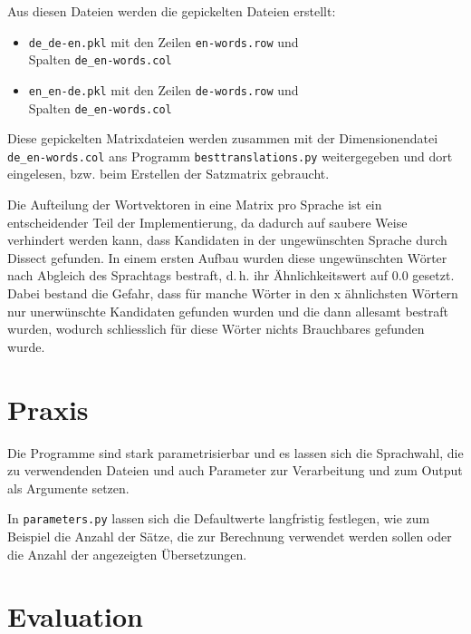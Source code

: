 \documentclass[11pt,twoside,openright]{mpreport}
\begin{document}
Aus diesen Dateien werden die gepickelten Dateien erstellt:
\begin{itemize}
\item \verb+de_de-en.pkl+ mit den Zeilen \verb+en-words.row+ und \\Spalten \verb+de_en-words.col+
\item \verb+en_en-de.pkl+ mit den Zeilen \verb+de-words.row+ und \\Spalten \verb+de_en-words.col+
\end{itemize}

Diese gepickelten Matrixdateien werden zusammen mit der Dimensionendatei \verb+de_en-words.col+ ans Programm \verb+besttranslations.py+ weitergegeben und dort eingelesen, bzw. beim Erstellen der Satzmatrix gebraucht.

Die Aufteilung der Wortvektoren in eine Matrix pro Sprache ist ein entscheidender Teil der Implementierung, da dadurch auf saubere Weise verhindert werden kann, dass Kandidaten in der ungewünschten Sprache durch Dissect gefunden. In einem ersten Aufbau wurden diese ungewünschten Wörter nach Abgleich des Sprachtags bestraft, d.\,h. ihr Ähnlichkeitswert auf 0.0 gesetzt. Dabei bestand die Gefahr, dass für manche Wörter in den x ähnlichsten Wörtern nur unerwünschte Kandidaten gefunden wurden und die dann allesamt bestraft wurden, wodurch schliesslich für diese Wörter nichts Brauchbares gefunden wurde.


\chapter{Praxis}
\label{cha:praxis}
Die Programme sind stark parametrisierbar und es lassen sich die Sprachwahl, die zu verwendenden Dateien und auch Parameter zur Verarbeitung und zum Output als Argumente setzen.

In \verb+parameters.py+ lassen sich die Defaultwerte langfristig festlegen, wie zum Beispiel die Anzahl der Sätze, die zur Berechnung verwendet werden sollen oder die Anzahl der angezeigten Übersetzungen.

\chapter{Evaluation}
\label{cha:evaluation}
\end{document}
